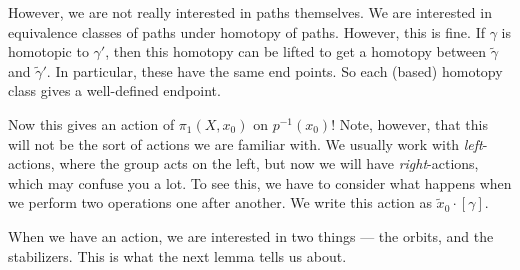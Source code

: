 \documentclass[a4paper]{article}
\begin{document}
However, we are not really interested in paths themselves. We are interested in equivalence classes of paths under homotopy of paths. However, this is fine. If $\gamma$ is homotopic to $\gamma'$, then this homotopy can be lifted to get a homotopy between $\tilde{\gamma}$ and $\tilde{\gamma}'$. In particular, these have the same end points. So each (based) homotopy class gives a well-defined endpoint.
\begin{center}
\end{center}
Now this gives an action of $\pi_1(X, x_0)$ on $p^{-1}(x_0)$! Note, however, that this will not be the sort of actions we are familiar with. We usually work with \emph{left}-actions, where the group acts on the left, but now we will have \emph{right}-actions, which may confuse you a lot. To see this, we have to consider what happens when we perform two operations one after another. We write this action as $\tilde{x}_0 \cdot [\gamma]$.

When we have an action, we are interested in two things --- the orbits, and the stabilizers. This is what the next lemma tells us about.
\end{document}

